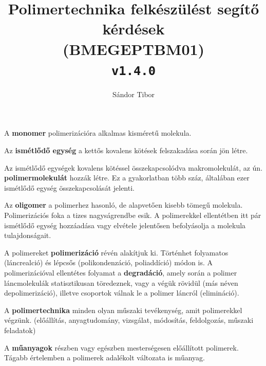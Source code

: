 \documentclass[12pt,a4paper]{article}       %
\title{Polimertechnika felkészülést segítő kérdések \\ \large(BMEGEPTBM01) \\ \texttt{v1.4.0}}
\author{Sándor Tibor}
\newcounter{questionctr}
\newenvironment{question}[1]{
  \refstepcounter{questionctr}
  \begin{tcolorbox}[
    colback=gray!25,
    colbacktitle=red!10!yellow!50,
    enhanced,
    sharp corners,
    boxrule=0mm,
    frame hidden,
    breakable,
    enhanced jigsaw,
    title={\textcolor{black}{\textsc{\# \thequestionctr{} – #1}}}
  ]


}{\end{tcolorbox}}
\begin{document}
\maketitle
\thispagestyle{fancy}

\begin{question}{
    Mi a polimer; monomer; oligomer? Mi a polimerizáció és mi a degradáció? Mi
    a polimertechnika? Mi a műanyag?
  }
  A \textbf{monomer} polimerizációra alkalmas kisméretű molekula.
  \tcbline

  Az \textbf{ismétlődő egység} a kettős kovalens kötések felszakadása során jön
  létre.
  \tcbline

  Az ismétlődő egységek kovalens kötéssel összekapcsolódva makromolekulát, az
  ún. \textbf{polimermolekulát} hozzák létre. Ez a gyakorlatban több száz,
  általában ezer ismétlődő egység összekapcsolását jelenti.
  \tcbline

  Az \textbf{oligomer} a polimerhez hasonló, de alapvetően kisebb tömegű
  molekula. Polimerizációs foka a tizes nagyságrendbe esik. A polimerekkel
  ellentétben itt pár ismétlődő egység hozzáadása vagy elvétele jelentősen
  befolyásolja a molekula tulajdonságait.
  \tcbline

  A polimereket \textbf{polimerizáció} révén alakítjuk ki. Történhet folyamatos
  (láncrealció) és lépcsős (polikondenzáció, poliaddíció) módon is. A
  polimerizációval ellentétes folyamat a \textbf{degradáció}, amely során a
  polimer láncmolekulák statisztikusan töredeznek, vagy a végük rövidül (más
  néven depolimerizáció), illetve csoportok válnak le a polimer láncról
  (elimináció).
  \tcbline

  A \textbf{polimertechnika} minden olyan műszaki tevékenység, amit
  polimerekkel végzünk. (előállítás, anyagtudomány, vizsgálat, módosítás,
  feldolgozás, műszaki feladatok)
  \tcbline

  A \textbf{műanyagok} részben vagy egészben mesterségesen előállított
  polimerek. Tágabb értelemben a polimerek adalékolt változata is műanyag.
\end{question}
\end{document}
